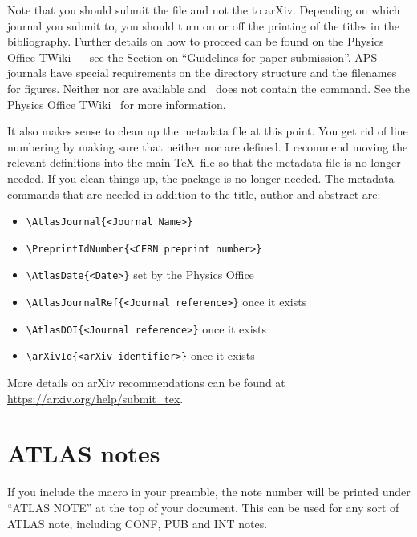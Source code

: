 Note that you should submit the  file and not the  to arXiv.
Depending on which journal you submit to, you should turn on or off the printing of the titles in the bibliography.
Further details on how to proceed can be found on the Physics Office TWiki~\cite{atlas-physicsoffice} -- see
the Section on \enquote{Guidelines for paper submission}.
APS journals have special requirements on the directory structure and the filenames for figures.
Neither  nor  are available
and \KOMAScript\ does not contain the  command.
See the Physics Office TWiki~\cite{atlas-physicsoffice} for more information.

It also makes sense to clean up the metadata file at this point.
You get rid of line numbering by making sure that neither  nor  are defined.
I recommend moving the relevant definitions into the main \TeX\ file so that the metadata file is no longer needed.
If you clean things up, the  package is no longer needed.
The metadata commands that are needed in addition to the title, author and abstract are:
\begin{itemize}
  \item {\verb|\AtlasJournal{<Journal Name>}|}
  \item {\verb|\PreprintIdNumber{<CERN preprint number>}|}
  \item {\verb|\AtlasDate{<Date>}|} set by the Physics Office
  \item {\verb|\AtlasJournalRef{<Journal reference>}|} once it exists
  \item {\verb|\AtlasDOI{<Journal reference>}|} once it exists
  \item {\verb|\arXivId{<arXiv identifier>}|} once it exists
\end{itemize}

More details on arXiv recommendations can be found at
\url{https://arxiv.org/help/submit_tex}.


\section{ATLAS notes}
\label{sec:note}

If you include the macro  in your preamble,
the note number will be printed under \enquote{ATLAS NOTE} at the top of your document.
This can be used for any sort of ATLAS note, including CONF, PUB and INT notes.


